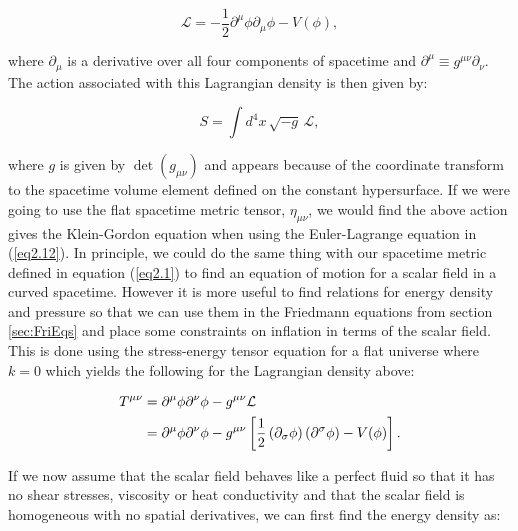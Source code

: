 \documentclass[a4paper,12pt,twoside]{report}
\begin{document}
\begin{equation}
\mathcal{L} = -\frac{1}{2}\partial^{\mu} \phi \partial_{\mu}\phi - V(\phi), \label{eq2.13}
\end{equation}

where $\partial_{\mu}$ is a derivative over all four components of spacetime and $\partial^{\mu} \equiv g^{\mu \nu}\partial_{\nu}$. The action associated with this Lagrangian density is then given by:

\begin{equation}
S = \int d^{4}x \hspace{2pt} \sqrt{-g} \hspace{2pt} \mathcal{L}, \label{eq2.14}
\end{equation}

where $g$ is given by $\det(g_{\mu \nu})$ and appears because of the coordinate transform to the spacetime volume element defined on the constant hypersurface. If we were going to use the flat spacetime metric tensor, $\eta_{\mu \nu}$, we would find the above action gives the Klein-Gordon equation when using the Euler-Lagrange equation in (\ref{eq2.12}). In principle, we could do the same thing with our spacetime metric defined in equation (\ref{eq2.1}) to find an equation of motion for a scalar field in a curved spacetime. However it is more useful to find relations for energy density and pressure so that we can use them in the Friedmann equations from section \ref{sec:FriEqs} and place some constraints on inflation in terms of the scalar field. This is done using the stress-energy tensor equation for a flat universe where $k = 0$ which yields the following for the Lagrangian density above:

\begin{equation}
\begin{aligned} \label{eq2.15}
\tensor{T}{^{\mu \nu}} &= \tensor{\partial}{^{\mu}}\phi \tensor{\partial}{^{\nu}}\phi - \tensor{g}{^{\mu \nu}} \mathcal{L} \\
&= \tensor{\partial}{^{\mu}}\phi \tensor{\partial}{^{\nu}}\phi - \tensor{g}{^{\mu \nu}} \left[\frac{1}{2} \left(\partial_{\sigma}\phi\right)\left(\partial^{\sigma}\phi \right) - V(\phi) \right].
\end{aligned}
\end{equation} 

If we now assume that the scalar field behaves like a perfect fluid so that it has no shear stresses, viscosity or heat conductivity and that the scalar field is homogeneous with no spatial derivatives, we can first find the energy density as:
\end{document}
